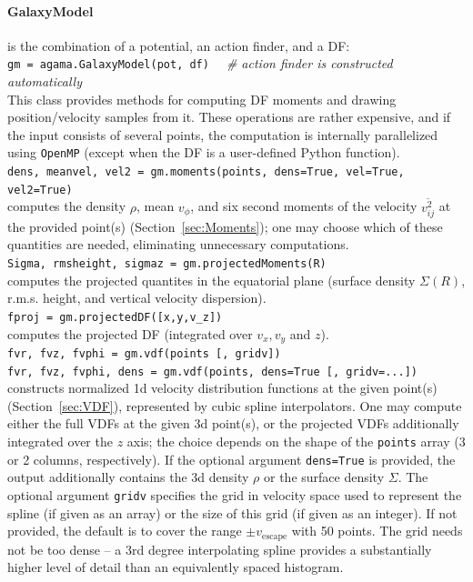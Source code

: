 \documentclass[12pt]{article}
\begin{document}
\paragraph{GalaxyModel} is the combination of a potential, an action finder, and a DF:\\
\texttt{gm = agama.GalaxyModel(pot, df)}
\textit{\color{Sepia}\ \ \# action finder is constructed automatically} \\[2mm]
This class provides methods for computing DF moments and drawing position/velocity samples from it. These operations are rather expensive, and if the input consists of several points, the computation is internally parallelized using \texttt{OpenMP} (except when the DF is a user-defined Python function).
\\[2mm]
\texttt{dens, meanvel, vel2 = gm.moments(points, dens=True, vel=True, vel2=True)}\\
computes the density $\rho$, mean $v_\phi$, and six second moments of the velocity $\overline{v^2_{ij}}$ at the provided point(s) (Section~\ref{sec:Moments}); one may choose which of these quantities are needed, eliminating unnecessary computations.
\\[2mm]
\texttt{Sigma, rmsheight, sigmaz = gm.projectedMoments(R)}\\
computes the projected quantites in the equatorial plane (surface density $\Sigma(R)$, r.m.s. height, and vertical velocity dispersion).
\\[2mm]
\texttt{fproj = gm.projectedDF([x,y,v_z])}\\
computes the projected DF (integrated over $v_x,v_y$ and $z$).\\[2mm]
\texttt{fvr, fvz, fvphi = gm.vdf(points [, gridv])}\\
\texttt{fvr, fvz, fvphi, dens = gm.vdf(points, dens=True [, gridv=...])}\\
constructs normalized 1d velocity distribution functions at the given point(s) (Section~\ref{sec:VDF}), represented by cubic spline interpolators. One may compute either the full VDFs at the given 3d point(s), or the projected VDFs additionally integrated over the $z$ axis; the choice depends on the shape of the \texttt{points} array (3 or 2 columns, respectively). If the optional argument \texttt{dens=True} is provided, the output additionally contains the 3d density $\rho$ or the surface density $\Sigma$.
The optional argument \texttt{gridv} specifies the grid in velocity space used to represent the spline (if given as an array) or the size of this grid (if given as an integer). If not provided, the default is to cover the range $\pm v_\mathrm{escape}$ with 50 points. The grid needs not be too dense -- a 3rd degree interpolating spline provides a substantially higher level of detail than an equivalently spaced histogram.
\end{document}
